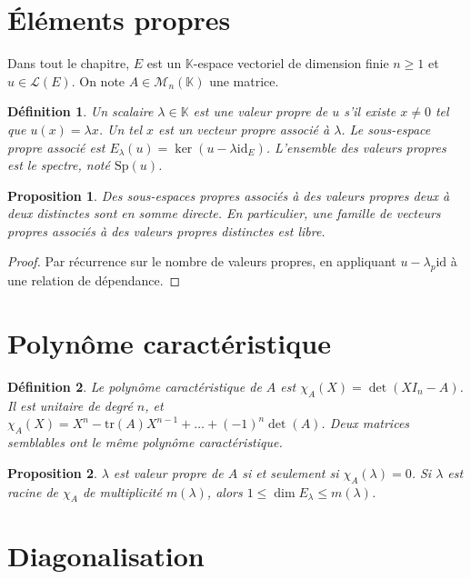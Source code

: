 \documentclass{article}
\newtheorem{definition}{Définition}
\newtheorem{proposition}{Proposition}
\begin{document}
\section{Éléments propres}

Dans tout le chapitre, $E$ est un $\mathbb{K}$-espace vectoriel de dimension finie $n \geq 1$
et $u \in \mathcal{L}(E)$. On note $A \in \mathcal{M}_n(\mathbb{K})$ une matrice.

\begin{definition}
Un scalaire $\lambda \in \mathbb{K}$ est une valeur propre de $u$ s'il existe $x \neq 0$ tel que
$u(x) = \lambda x$. Un tel $x$ est un vecteur propre associé à $\lambda$.
Le sous-espace propre associé est $E_\lambda(u) = \ker(u - \lambda \mathrm{id}_E)$.
L'ensemble des valeurs propres est le spectre, noté $\mathrm{Sp}(u)$.
\end{definition}

\begin{proposition}
Des sous-espaces propres associés à des valeurs propres deux à deux distinctes sont en somme
directe. En particulier, une famille de vecteurs propres associés à des valeurs propres
distinctes est libre.
\end{proposition}

\begin{proof}
Par récurrence sur le nombre de valeurs propres, en appliquant $u - \lambda_p \mathrm{id}$
à une relation de dépendance.
\end{proof}

\section{Polynôme caractéristique}

\begin{definition}
Le polynôme caractéristique de $A$ est $\chi_A(X) = \det(X I_n - A)$. Il est unitaire de
degré $n$, et $\chi_A(X) = X^n - \mathrm{tr}(A) X^{n-1} + \dots + (-1)^n \det(A)$.
Deux matrices semblables ont le même polynôme caractéristique.
\end{definition}

\begin{proposition}
$\lambda$ est valeur propre de $A$ si et seulement si $\chi_A(\lambda) = 0$.
Si $\lambda$ est racine de $\chi_A$ de multiplicité $m(\lambda)$, alors
$1 \leq \dim E_\lambda \leq m(\lambda)$.
\end{proposition}

\section{Diagonalisation}
\end{document}
